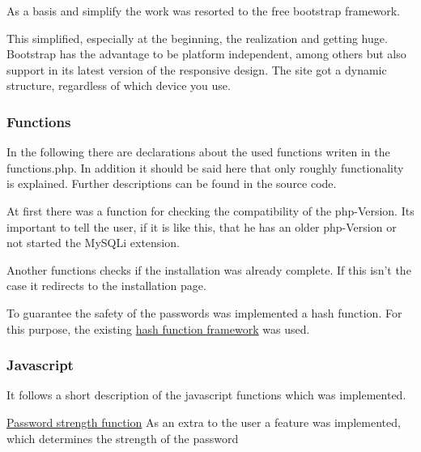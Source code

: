\documentclass[a4paper,12pt,oneside]{article} %
\begin{document}
As a basis and simplify the work was resorted to the free bootstrap
framework. 

This simplified, especially at the beginning, the realization and
getting huge. Bootstrap has the advantage to be platform independent,
among others but also support in its latest version of the \textquotedbl{}responsive
design\textquotedbl{}. The site got a dynamic structure, regardless
of which device you use.

\subsubsection{Functions}
In the following there are declarations about the used functions writen in the functions.php.
In addition it should be said here that only roughly functionality is explained. Further descriptions can be found in the source code.

At first there was a function for checking the compatibility of the php-Version. Its important to tell the user, if it is like this, that he has an older php-Version or not started the MySQLi extension. 

Another functions checks if the installation was already complete. If this isn't the case it redirects to the installation page. 

To guarantee the safety of the passwords was implemented a hash function. 
For this purpose, the existing \hyperlink{http://www.openwall.com/phpass/}{hash function framework}  was used. 

\subsubsection{Javascript}
It follows a short description of the javascript functions which was implemented. 

\hyperlink{https://github.com/ocean90/wpfmw-gallery/blob/master/assets/js/password-strength.js}{Password strength function}
As an extra to the user a feature was implemented, which determines the strength of the password
\end{document}
